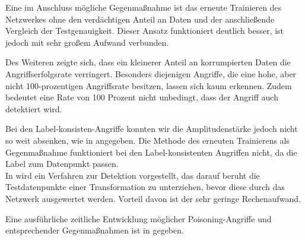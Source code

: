 \documentclass{article}
\theoremstyle{break}
\begin{document}
\noindent Eine im Anschluss mögliche Gegenmaßnahme ist das erneute Trainieren des Netzwerkes ohne den verdächtigen Anteil an Daten und der anschließende Vergleich der Testgenauigkeit. Dieser Ansatz funktioniert deutlich besser, ist jedoch mit sehr großem Aufwand verbunden.

\noindent Des Weiteren zeigte sich, dass ein kleinerer Anteil an korrumpierten Daten die Angriffserfolgsrate verringert.
Besonders diejenigen Angriffe, die eine hohe, aber nicht 100-prozentigen Angriffsrate besitzen, lassen sich kaum erkennen.
Zudem bedeutet eine Rate von 100 Prozent nicht unbedingt, dass der Angriff auch detektiert wird.

\noindent Bei den Label-konsisten-Angriffe konnten wir die Amplitudenstärke jedoch nicht so weit absenken, wie in \cite{labelconsistent} angegeben.
Die Methode des erneuten Trainierens als Gegenmaßnahme funktioniert bei den Label-konsistenten Angriffen nicht, da die Label zum Datenpunkt passen.\\

\noindent In \cite{transformation_defense} wird ein Verfahren zur Detektion vorgestellt, das darauf beruht die Testdatenpunkte einer Transformation zu unterziehen, bevor diese durch das Netzwerk ausgewertet werden. Vorteil davon ist der sehr geringe Rechenaufwand.

\noindent Eine ausführliche zeitliche Entwicklung möglicher Poisoning-Angriffe und entsprechender Gegenmaßnahmen ist in \cite{review} gegeben.
\end{document}
